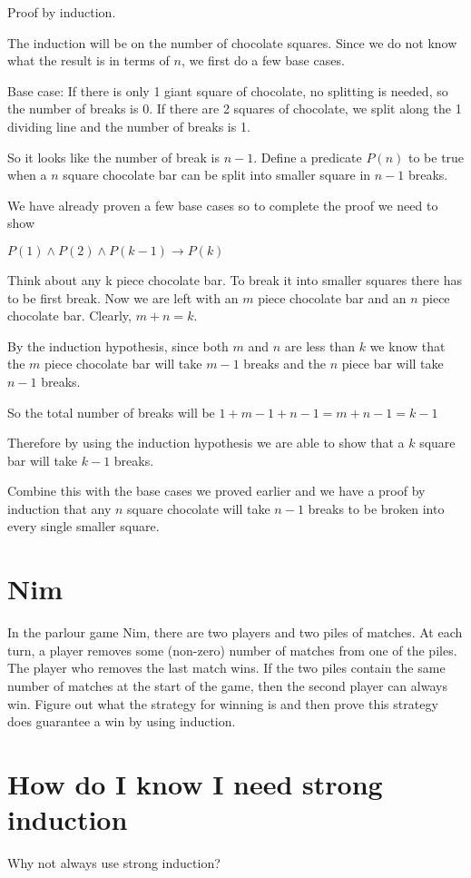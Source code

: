 \documentclass[12pt]{article}
\begin{document}
Proof by induction.

The induction will be on the number of chocolate squares. Since we do not know what the result is in terms of $n$, we first do a few base cases.

Base case: If there is only 1 giant square of chocolate, no splitting is needed, so the number of breaks is 0. If there are 2 squares of chocolate, we split along the 1 dividing line and the number of breaks is 1.

So it looks like the number of break is $n-1$. Define a predicate $P(n)$ to be true when a $n$ square chocolate bar can be split into smaller square in $n-1$ breaks. 

We have already proven a few base cases so to complete the proof we need to show

$P(1) \wedge P(2) \wedge P(k-1) \rightarrow P(k)$

Think about any k piece chocolate bar. To break it into smaller squares there has to be first break. Now we are left with an $m$ piece chocolate bar and an $n$ piece chocolate bar. Clearly, $m +n = k$.


By the induction hypothesis, since both $m$ and $n$ are less than $k$ we know that the $m$ piece chocolate bar will take $m-1$ breaks and the $n$ piece bar will take $n-1$ breaks.

So the total number of breaks will be $1 + m-1 + n- 1 = m+n -1 = k - 1$

Therefore by using the induction hypothesis we are able to show that a $k$ square bar will take $k-1$ breaks. 

Combine this with the base cases we proved earlier and we have a proof by induction that any $n$ square chocolate will take $n-1$ breaks to be broken into every single smaller square.


\section*{Nim}
In the parlour game Nim, there are two players and two piles of matches. At each
turn, a player removes some (non-zero) number of matches from one of the piles. The
player who removes the last match wins. If the two piles contain the same number of
matches at the start of the game, then the second player can always win. Figure out
what the strategy for winning is and then prove this strategy does guarantee a win by
using induction.


\section*{How do I know I need strong induction}
Why not always use strong induction? 
\end{document}

